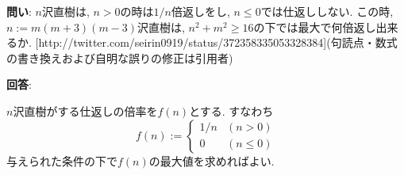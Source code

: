 \documentclass[11pt,a4paper,twocolumn]{jsarticle}
\begin{document}
{\bf 問い}: $n$沢直樹は, $n>0$の時は$1/n$倍返しをし, $n \le 0$では仕返ししない. この時, $n := m(m+3)(m-3)$沢直樹は, $n^2+m^2 \ge 16$の下では最大で何倍返し出来るか. [http://\allowbreak{}twitter.com/seirin0919/status/372358335053\allowbreak{}328384](句読点・数式の書き換えおよび自明な誤りの修正は引用者)

\bigskip

{\bf 回答}:

\smallskip
\noindent $n$沢直樹がする仕返しの倍率を$f(n)$とする.
すなわち
\[ f(n) := \begin{cases}
  1 / n & (n > 0) \\
  0 & (n \le 0)
\end{cases} \]
与えられた条件の下で$f(n)$の最大値を求めればよい.
\end{document}
